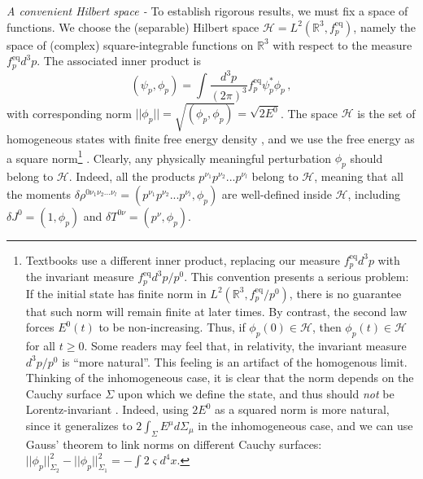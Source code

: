 \documentclass[a4paper, amsfonts, amssymb, amsmath, reprint, showkeys, nofootinbib, twoside, onecolumn,notitlepage,,longbibliography]{revtex4-2}
\theoremstyle{definition}
\theoremstyle{theorem}
\theoremstyle{corollary}
\begin{document}
\noindent \textit{A convenient Hilbert space -} To establish rigorous results, we must fix a space of functions. We choose the (separable) Hilbert space $\mathcal{H}=L^2(\mathbb{R}^3, f^{\text{eq}}_p)$, namely the space of (complex) square-integrable functions on $\mathbb{R}^3$ with respect to the measure $f^{\text{eq}}_p d^3 p$. The associated inner product is
\begin{equation}\label{sguec}
    (\psi_p,\phi_p) = \int \dfrac{d^3 p}{(2\pi)^3} f_p^{\text{eq}} \psi_p^* \phi_p \, ,
\end{equation}
with corresponding norm $|| \phi_p ||=\sqrt{(\phi_p,\phi_p)}=\sqrt{2E^0}$. The space $\mathcal{H}$ is the set of homogeneous states with finite free energy density \cite{GavassinoGENERIC2022,Mullins:2023tjg,Mullins:2023bur}, and we use the free energy as a square norm\footnote{Textbooks \cite{Groot1980RelativisticKT,cercignani_book} use a different inner product, replacing our measure $f^{\text{eq}}_p d^3p$ with the invariant measure $f^{\text{eq}}_p d^3 p/p^0$. This convention presents a serious problem: If the initial state has finite norm in $L^2(\mathbb{R}^3,f^{\text{eq}}_p/p^0)$, there is no guarantee that such norm will remain finite at later times. By contrast, the second law forces $E^0(t)$ to be non-increasing. Thus, if $\phi_p(0)\in \mathcal{H}$, then $\phi_p(t)\in \mathcal{H}$ for all $t \geq 0$. Some readers may feel that, in relativity, the invariant measure $d^3 p/p^0$ is ``more natural''. This feeling is an artifact of the homogenous limit. Thinking of the inhomogeneous case, it is clear that the norm depends on the Cauchy surface $\Sigma$ upon which we define the state, and thus should \textit{not} be Lorentz-invariant \cite{Hishcock1983,GerochLindblom1990,Geroch_Lindblom_1991_causal}. Indeed, using $2E^0$ as a squared norm is more natural, since it generalizes to $2\int_\Sigma E^\mu d\Sigma_\mu$ in the inhomogeneous case, and we can use Gauss' theorem \cite{MTW_book} to link norms on different Cauchy surfaces: $|| \phi_p ||^2_{\Sigma_2}-|| \phi_p ||^2_{\Sigma_1}=-\int 2\varsigma d^4 x$.} \cite{Dudynski1988}. Clearly, any physically meaningful perturbation $\phi_p$ should belong to $\mathcal{H}$. Indeed, all the products $p^{\nu_1}p^{\nu_2}...p^{\nu_l}$ belong to $\mathcal{H}$, meaning that all the moments $\delta \rho^{0\nu_1 \nu_2...\nu_l}=(p^{\nu_1}p^{\nu_2}...p^{\nu_l},\phi_p)$ are well-defined inside $\mathcal{H}$, including $\delta J^0=(1,\phi_p)$ and $\delta T^{0\nu}=(p^\nu,\phi_p)$.
\end{document}
